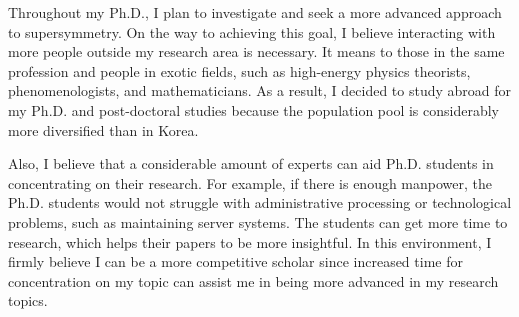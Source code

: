 
Throughout my Ph.D., I plan to investigate and seek a more advanced approach to supersymmetry. On the way to achieving this goal, I believe interacting with more people outside my research area is necessary. It means to those in the same profession and people in exotic fields, such as high-energy physics theorists, phenomenologists, and mathematicians. As a result, I decided to study abroad for my Ph.D. and post-doctoral studies because the population pool is considerably more diversified than in Korea.

Also, I believe that a considerable amount of experts can aid Ph.D. students in concentrating on their research. For example, if there is enough manpower, the Ph.D. students would not struggle with administrative processing or technological problems, such as maintaining server systems. The students can get more time to research, which helps their papers to be more insightful. In this environment, I firmly believe I can be a more competitive scholar since increased time for concentration on my topic can assist me in being more advanced in my research topics. 